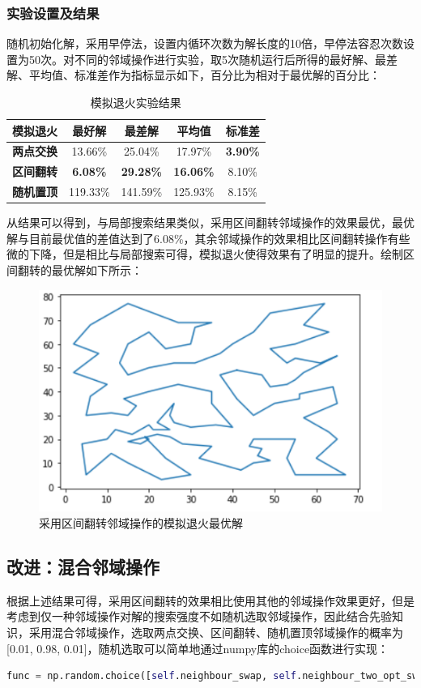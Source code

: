 \documentclass[withoutpreface,bwprint]{cumcmthesis} %
\begin{document}
\subsubsection{实验设置及结果}
随机初始化解，采用早停法，设置内循环次数为解长度的10倍，早停法容忍次数设置为50次。对不同的邻域操作进行实验，取5次随机运行后所得的最好解、最差解、平均值、标准差作为指标显示如下，百分比为相对于最优解的百分比：
\begin{table}[H]
\centering
\caption{模拟退火实验结果}
\label{sa}
\begin{tabular}{|c|c|c|c|c|}
\hline
\textbf{模拟退火} & \textbf{最好解}    & \textbf{最差解}     & \textbf{平均值}     & \textbf{标准差}    \\ \hline
\textbf{两点交换} & 13.66\%         & 25.04\%          & 17.97\%          & \textbf{3.90\%} \\ \hline
\textbf{区间翻转} & \textbf{6.08\%} & \textbf{29.28\%} & \textbf{16.06\%} & 8.10\%          \\ \hline
\textbf{随机置顶} & 119.33\%        & 141.59\%         & 125.93\%         & 8.15\%          \\ \hline
\end{tabular}
\end{table}
从结果可以得到，与局部搜索结果类似，采用区间翻转邻域操作的效果最优，最优解与目前最优值的差值达到了6.08\%，其余邻域操作的效果相比区间翻转操作有些微的下降，但是相比与局部搜索可得，模拟退火使得效果有了明显的提升。绘制区间翻转的最优解如下所示：
\begin{figure}[H]
		\centering
		\includegraphics[width=0.5\linewidth]{sa_b}
		\caption{采用区间翻转邻域操作的模拟退火最优解}
\end{figure}


\subsection{改进：混合邻域操作}
	根据上述结果可得，采用区间翻转的效果相比使用其他的邻域操作效果更好，但是考虑到仅一种邻域操作对解的搜索强度不如随机选取邻域操作，因此结合先验知识，采用混合邻域操作，选取两点交换、区间翻转、随机置顶邻域操作的概率为[0.01, 0.98, 0.01]，随机选取可以简单地通过numpy库的choice函数进行实现：
	\begin{lstlisting}[language=python]
		func = np.random.choice([self.neighbour_swap, self.neighbour_two_opt_swap, self.neighbour_two_h_opt_swap], p=[0.01, 0.98, 0.01])
	\end{lstlisting}
	
\end{document}
